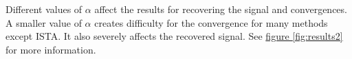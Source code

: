 \documentclass[]{article}
\theoremstyle{definition}
\numberwithin{equation}{subsection}
\begin{document}
        Different values of $\alpha$ affect the results for recovering the signal and convergences. 
        A smaller value of $\alpha$ creates difficulty for the convergence for many methods except ISTA. 
        It also severely affects the recovered signal.
        See \hyperref[fig:results2]{figure \ref*{fig:results2}} for more information. 
        \begin{figure}[H]
            \centering
            \\
\end{figure}
\end{document}
